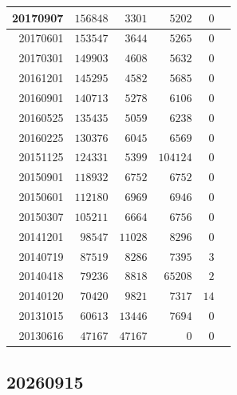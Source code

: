 \documentclass[hidelinks,a4paper,12pt]{article}
\begin{document}
\begin{longtable}{|r|r|r|r|r|r|}
20170907         & $156848$         & $3301$         & $5202$           & $0$              \\ \hline
20170601         & $153547$         & $3644$         & $5265$           & $0$              \\ \hline
20170301         & $149903$         & $4608$         & $5632$           & $0$              \\ \hline
20161201         & $145295$         & $4582$         & $5685$           & $0$              \\ \hline
20160901         & $140713$         & $5278$         & $6106$           & $0$              \\ \hline
20160525         & $135435$         & $5059$         & $6238$           & $0$              \\ \hline
20160225         & $130376$         & $6045$         & $6569$           & $0$              \\ \hline
20151125         & $124331$         & $5399$         & $104124$         & $0$              \\ \hline
20150901         & $118932$         & $6752$         & $6752$           & $0$              \\ \hline
20150601         & $112180$         & $6969$         & $6946$           & $0$              \\ \hline
20150307         & $105211$         & $6664$         & $6756$           & $0$              \\ \hline
20141201         & $98547$          & $11028$        & $8296$           & $0$              \\ \hline
20140719         & $87519$          & $8286$         & $7395$           & $3$              \\ \hline
20140418         & $79236$          & $8818$         & $65208$          & $2$              \\ \hline
20140120         & $70420$          & $9821$         & $7317$           & $14$             \\ \hline
20131015         & $60613$          & $13446$        & $7694$           & $0$              \\ \hline
20130616         & $47167$          & $47167$        & $0$              & $0$              \\ \hline
\end{longtable}

\subsection{20260915}  \label{sec:changelog_20260915}
\end{document}
